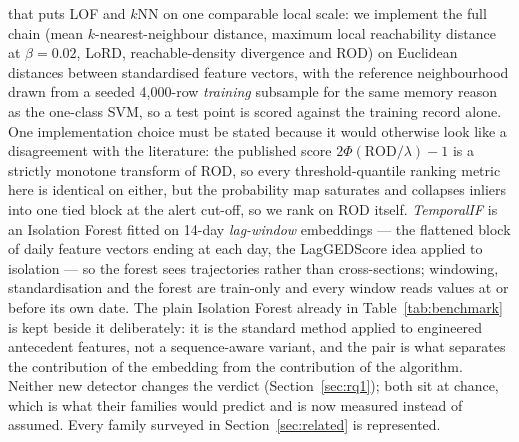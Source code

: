 \documentclass[preprint,12pt]{elsarticle}
\begin{document}
that puts LOF and $k$NN on one comparable local scale: we implement the full
chain (mean $k$-nearest-neighbour distance, maximum local reachability distance
at $\beta=0.02$, LoRD, reachable-density divergence and ROD) on Euclidean
distances between standardised feature vectors, with the reference neighbourhood
drawn from a seeded 4{,}000-row \emph{training} subsample for the same memory
reason as the one-class SVM, so a test point is scored against the training
record alone. One implementation choice must be stated because it would
otherwise look like a disagreement with the literature: the published score
$2\Phi(\mathrm{ROD}/\lambda)-1$ is a strictly monotone transform of ROD, so every
threshold-quantile ranking metric here is identical on either, but the
probability map saturates and collapses inliers into one tied block at the alert
cut-off, so we rank on ROD itself. \emph{TemporalIF} is an Isolation Forest
fitted on 14-day \emph{lag-window} embeddings --- the flattened block of daily
feature vectors ending at each day, the LagGEDScore idea applied to isolation ---
so the forest sees trajectories rather than cross-sections; windowing,
standardisation and the forest are train-only and every window reads values at or
before its own date. The plain Isolation Forest already in
Table~\ref{tab:benchmark} is kept beside it deliberately: it is the standard
method applied to engineered antecedent features, not a sequence-aware variant,
and the pair is what separates the contribution of the embedding from the
contribution of the algorithm. Neither new detector changes the verdict
(Section~\ref{sec:rq1}); both sit at chance, which is what their families would
predict and is now measured instead of assumed. Every family surveyed in
Section~\ref{sec:related} is represented.
\end{document}
